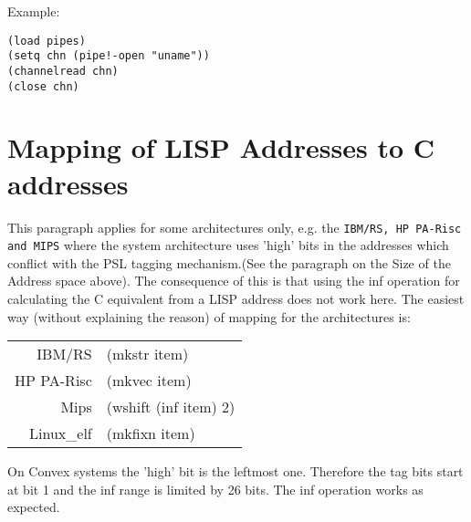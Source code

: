                                                
Example:
\begin{verbatim}
(load pipes)
(setq chn (pipe!-open "uname"))
(channelread chn)
(close chn)
\end{verbatim}

\section{Mapping of LISP Addresses to C addresses}

This paragraph applies for some architectures only, e.g. 
the {\tt IBM/RS, HP PA-Risc and MIPS} where the system architecture
uses 'high' bits in the addresses which conflict with the
PSL tagging mechanism.(See the paragraph on the Size of the
Address space above).  The consequence of this is that using the 
inf operation
for calculating the C equivalent from a LISP address does not
work here. The easiest way (without explaining the reason)
of mapping for the architectures is:

\begin{tabular}{rl}
	IBM/RS&(mkstr item) \\
	HP PA-Risc&(mkvec item)\\
	Mips&(wshift (inf item) 2) \\
	Linux\_elf&(mkfixn item)
\end{tabular}

On Convex systems the 'high' bit is the leftmost one. Therefore the
tag bits start at bit 1 and the inf range is limited by 26 bits.
The inf operation works as expected.

